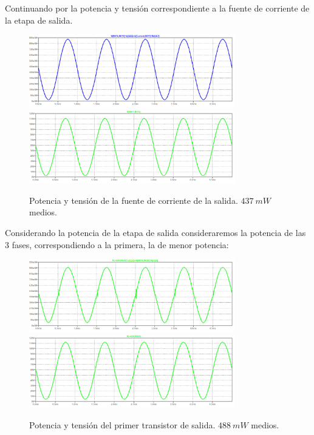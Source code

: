 Continuando por la potencia y tensión correspondiente a la fuente de corriente de la etapa de salida.
\begin{figure}[H]
	\centering
	\includegraphics[width=0.8\textwidth]{ImagenesSimulaciones/PCSVBE.png}
		\includegraphics[width=0.8\textwidth]{ImagenesSimulaciones/VCSVBE.png}
	\caption{Potencia y tensión de la fuente de corriente de la salida. $437 \ mW$ medios.}
	\label{fig:pcsvbe}
\end{figure}
Considerando la potencia de la etapa de salida consideraremos la potencia de las 3 fases, correspondiendo a la primera, la de menor potencia:
\begin{figure}[H]
	\centering
	\includegraphics[width=0.8\textwidth]{ImagenesSimulaciones/PO1.png}
		\includegraphics[width=0.8\textwidth]{ImagenesSimulaciones/VO1.png}
	\caption{Potencia y tensión del primer transistor de salida. $488 \ mW$ medios.}
	\label{fig:po1}
\end{figure}
